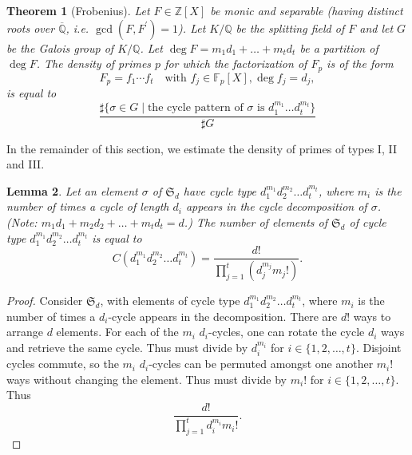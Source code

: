 \documentclass[11pt]{article}
\theoremstyle{plain}
\newtheorem{theorem}{Theorem}[section]
\newtheorem{lemma}[theorem]{Lemma}
\theoremstyle{definition}
\theoremstyle{remark}
\numberwithin{equation}{section}
\numberwithin{table}{section}
\newcommand{\ZZ}{\mathbb{Z}}
\newcommand{\FF}{\mathbb{F}}
\newcommand{\QQ}{\mathbb{Q}}
\renewcommand{\SS}{\mathfrak{S}}
\begin{document}
\begin{theorem}[Frobenius]\label{thm:frobenius}
  Let $F\in\ZZ[X]$ be monic and separable (having distinct roots over
  $\overline{\QQ}$, i.e. $\gcd(F, F^\prime)=1$).  Let $K/\QQ$ be the splitting
  field of $F$ and let $G$ be the Galois group of $K/\QQ$.  
  Let $\deg F=m_1d_1+\ldots+m_td_t$ be a partition of $\deg F$.  
  The density of primes $p$ for which the factorization of $F_p$ is of the
  form
  \begin{equation*}
    F_p=f_1\cdots f_t\quad\text{with }f_j\in\FF_p[X], \deg f_j=d_j,
  \end{equation*}
  is equal to
  \begin{equation*}
    \frac{\sharp\{\sigma\in G\mid\text{the cycle pattern of $\sigma$ is 
    $d_1^{m_1}\ldots d_t^{m_t}$}\}
    }{\sharp G}
  \end{equation*}
\end{theorem}

In the remainder of this section, we estimate the density of primes of types
I, II and III.

\begin{lemma}\label{lem:cycletype}
  Let an element $\sigma$ of $\SS_d$ have cycle type $d_1^{m_1}d_2^{m_2}\ldots d_t^{m_t}$, 
  where $m_i$ is the number of times a cycle of length $d_i$ appears in the cycle
  decomposition of $\sigma$. (Note: $m_1d_1+m_2d_2+\ldots +m_td_t=d$.) The number
   of elements of $\SS_d$ of cycle type $d_1^{m_1}d_2^{m_2}\ldots d_t^{m_t}$ is equal to
  \begin{equation*}
    C(d_1^{m_1}d_2^{m_2}\ldots d_t^{m_t})=\frac{d!}{\prod_{j=1}^t\left(d_j^{m_j}m_j!\right)}.
  \end{equation*}


\end{lemma}
\begin{proof}
  Consider $\SS_d$, with elements of cycle type $d_1^{m_1} d_2^{m_2} \ldots d_t^{m_t}$, 
  where $m_i$ is the number of times a $d_i$-cycle appears in the decomposition.
  There are $d!$ ways to arrange $d$ elements.
  For each of the $m_i$ $d_i$-cycles, one can rotate the cycle $d_i$ ways and retrieve the 
  same cycle. Thus must divide by $d_i^{m_i}$ for $i \in \{1,2,\ldots,t\}$.
  Disjoint cycles commute, so the $m_i$ $d_i$-cycles can be permuted amongst one another 
  $m_i!$ ways without changing the element. Thus must divide by $m_i!$ for $i \in \{1,2,\ldots,t\}$.
  Thus
  \begin{equation*}
    \frac{d!}{\prod_{j=1}^t d_i^{m_i} m_i!}.
  \end{equation*}
\end{proof}
\end{document}
